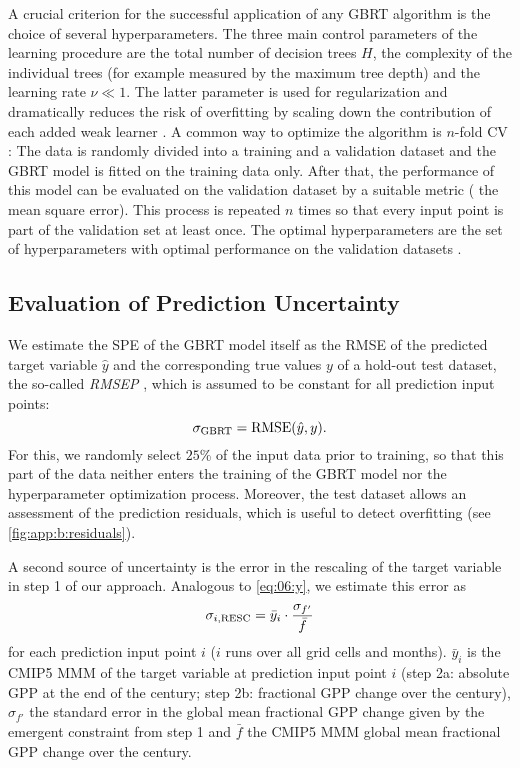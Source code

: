 A crucial criterion for the successful application of any \ac{GBRT} algorithm
is the choice of several hyperparameters. The three main control parameters of
the learning procedure are the total number of decision trees $H$, the
complexity of the individual trees (for example measured by the maximum tree
depth) and the learning rate $\nu \ll 1$. The latter parameter is used for
regularization and dramatically reduces the risk of overfitting by scaling down
the contribution of each added weak learner \autocite{Death2007, Elith2008,
  Friedman2001}. A common way to optimize the algorithm is $n$-fold \acf{CV}
\autocite{Bishop2006}: The data is randomly divided into a training and a
validation dataset and the \acs{GBRT} model is fitted on the training data
only. After that, the performance of this model can be evaluated on the
validation dataset by a suitable metric (\eg{} the mean square error). This
process is repeated $n$ times so that every input point is part of the
validation set at least once. The optimal hyperparameters are the set of
hyperparameters with optimal performance on the validation datasets
\autocite{Elith2008}.


\subsection{Evaluation of Prediction Uncertainty}
\label{subsec:app:b:uncertainty}

We estimate the \acf{SPE} of the \ac{GBRT} model itself as the \ac{RMSE} of the
predicted target variable $\hat{y}$ and the corresponding true values $y$ of a
hold-out test dataset, the so-called \emph{\acf{RMSEP}} \autocite{Bishop2006},
which is assumed to be constant for all prediction input points:
\begin{equation}
  \sigma_{\textnormal{GBRT}} = \textnormal{RMSE}(\hat{y}, y).
  \label{eq:app:b:sigma_gbrt}
\end{equation}
For this, we randomly select $25 \unit{\%}$ of the input data prior to
training, so that this part of the data neither enters the training of the
\ac{GBRT} model nor the hyperparameter optimization process. Moreover, the test
dataset allows an assessment of the prediction residuals, which is useful to
detect overfitting (see \cref{fig:app:b:residuals}).

A second source of uncertainty is the error in the rescaling of the target
variable in step 1 of our approach. Analogous to \cref{eq:06:y}, we estimate
this error as
\begin{equation}
  \sigma_{i, \textnormal{RESC}} = \bar{y}_i \cdot \frac{\sigma_{f'}}{\bar{f}}
  \label{eq:app:b:sigma_rescaling}
\end{equation}
for each prediction input point $i$ ($i$ runs over all grid cells and months).
$\bar{y}_i$ is the \acs{CMIP}5 \acf{MMM} of the target variable at prediction
input point $i$ (step 2a: absolute \ac{GPP} at the end of the  century;
step 2b: fractional \ac{GPP} change over the  century), $\sigma_{f'}$
the standard error in the global mean fractional \acs{GPP} change given by the
emergent constraint from step 1 and $\bar{f}$ the \acs{CMIP}5 \ac{MMM} global
mean fractional \ac{GPP} change over the  century.

